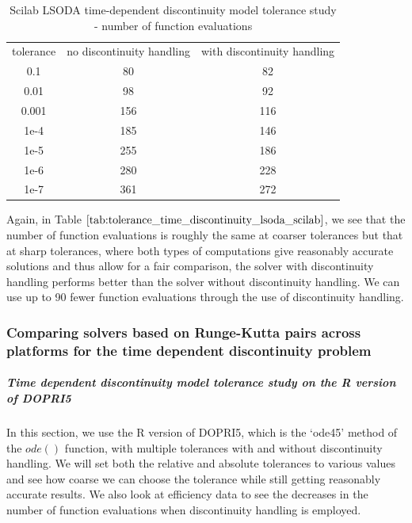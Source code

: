 \begin{table}[H]
\caption {Scilab LSODA time-dependent discontinuity model tolerance study - number of function evaluations} 
\label{tab:tolerance_time_discontinuity_lsoda_scilab} 
\begin{center}
\begin{tabular}{ c c c }
tolerance & no discontinuity handling & with discontinuity handling \\ 
0.1 & 80 & 82 \\
0.01 & 98 & 92 \\
0.001 & 156 & 116 \\
1e-4 & 185 & 146 \\
1e-5 & 255 & 186 \\
1e-6 & 280 & 228 \\
1e-7 & 361 & 272 \\
\end{tabular}
\end{center}
\end{table}
Again, in Table $\ref{tab:tolerance_time_discontinuity_lsoda_scilab}$, we see that the number of function evaluations is roughly the same at coarser tolerances but that at sharp tolerances, where both types of computations give reasonably accurate solutions and thus allow for a fair comparison, the solver with discontinuity handling performs better than the solver without discontinuity handling. We can use up to 90 fewer function evaluations through the use of discontinuity handling. 

\subsubsection{Comparing solvers based on Runge-Kutta pairs across platforms for the time dependent discontinuity problem}
\subparagraph{Time dependent discontinuity model tolerance study on the R version of DOPRI5}
In this section, we use the R version of DOPRI5, which is the `ode45' method of the $ode()$ function, with multiple tolerances with and without discontinuity handling. We will set both the relative and absolute tolerances to various values and see how coarse we can choose the tolerance while still getting reasonably accurate results. We also look at efficiency data to see the decreases in the number of function evaluations when discontinuity handling is employed.

